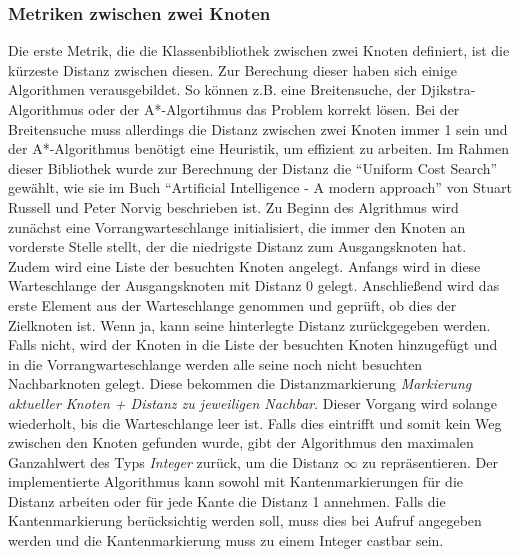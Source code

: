 \documentclass[a4paper,12pt,ngerman,chapterprefix=false,listof=totoc,bibliography=totoc]{scrreprt}
\begin{document}
{{\subsubsection*{Metriken zwischen zwei Knoten}
{
Die erste Metrik, die die Klassenbibliothek zwischen zwei Knoten definiert, ist die kürzeste Distanz zwischen diesen. Zur Berechung dieser haben sich einige Algorithmen verausgebildet. So können z.B. eine Breitensuche, der Djikstra-Algorithmus oder der A*-Algortihmus das Problem korrekt lösen. Bei der Breitensuche muss allerdings die Distanz zwischen zwei Knoten immer 1 sein und der A*-Algorithmus benötigt eine Heuristik, um effizient zu arbeiten. Im Rahmen dieser Bibliothek wurde zur Berechnung der Distanz die "`Uniform Cost Search"' gewählt, wie sie im Buch "`Artificial Intelligence - A modern approach"' von Stuart Russell und Peter Norvig beschrieben ist. Zu Beginn des Algrithmus wird zunächst eine Vorrangwarteschlange initialisiert, die immer den Knoten an vorderste Stelle stellt, der die niedrigste Distanz zum Ausgangsknoten hat. Zudem wird eine Liste der besuchten Knoten angelegt. Anfangs wird in diese Warteschlange der Ausgangsknoten mit Distanz 0 gelegt. Anschließend wird das erste Element aus der Warteschlange genommen und geprüft, ob dies der Zielknoten ist. Wenn ja, kann seine hinterlegte Distanz zurückgegeben werden. Falls nicht, wird der Knoten in die Liste der besuchten Knoten hinzugefügt und in die Vorrangwarteschlange werden alle seine noch nicht besuchten Nachbarknoten gelegt. Diese bekommen die Distanzmarkierung \textit{Markierung aktueller Knoten + Distanz zu jeweiligen Nachbar}. Dieser Vorgang wird solange wiederholt, bis die Warteschlange leer ist. Falls dies eintrifft und somit kein Weg zwischen den Knoten gefunden wurde, gibt der Algorithmus den maximalen Ganzahlwert des Typs \textit{Integer} zurück, um die Distanz \(\infty\) zu repräsentieren. Der implementierte Algorithmus kann sowohl mit Kantenmarkierungen für die Distanz arbeiten oder für jede Kante die Distanz 1 annehmen. Falls die Kantenmarkierung berücksichtig werden soll, muss dies bei Aufruf angegeben werden und die Kantenmarkierung muss zu einem Integer castbar sein. \cite{russell_artificial_2016}

}}}
\end{document}
